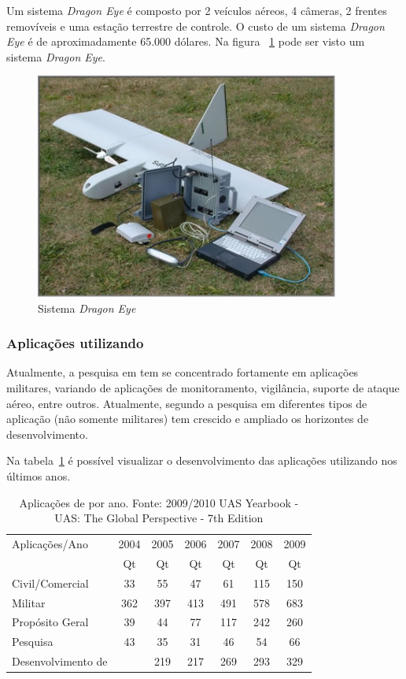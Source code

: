 Um sistema \emph{Dragon Eye} é composto por 2 veículos aéreos, 4 câmeras, 2 frentes removíveis e uma estação terrestre de controle. O custo de um sistema \emph{Dragon Eye} é
de aproximadamente 65.000 dólares. Na figura ~\ref{fig:dragon_eye} pode ser visto um sistema \emph{Dragon Eye}.


\begin{figure}[h!]
\centering
\includegraphics[width=10cm]{pictures/dragon_eye_system.jpg}
\caption{Sistema \emph{Dragon Eye} }
 \label{fig:dragon_eye}
\end{figure}




\subsubsection{Aplicações utilizando \vants}
Atualmente, a pesquisa em \vants tem se concentrado fortamente em aplicações militares, variando de aplicações de monitoramento, vigilância, suporte de ataque aéreo, entre outros. Atualmente, segundo \cite{Valavanis2007} a pesquisa em diferentes tipos de aplicação (não somente militares) tem crescido e ampliado os horizontes de desenvolvimento.

Na tabela~\ref{tbl:vants_por_ano} é possível visualizar o desenvolvimento das aplicações utilizando \vants nos últimos anos.


\begin{table}[h!]
\centering
	\begin{tabular}{| l | c | c | c | c | c | c |}
		\hline
		Aplicações/Ano & 2004 & 2005 & 2006 & 2007 & 2008 & 2009 \\
		\cline{2-7}
		 & Qt & Qt & Qt & Qt & Qt & Qt  \\
		\hline
		Civil/Comercial  & 33 &  55  & 47  & 61  & 115  & 150 \\
		Militar  & 362  & 397  & 413  & 491  & 578  & 683 \\
		Propósito Geral &  39  & 44  & 77  & 117  & 242  & 260 \\
		Pesquisa  & 43  & 35  & 31  & 46  & 54  & 66 \\
		Desenvolvimento de \vants &   & 219  & 217  & 269  & 293  & 329 \\
		\hline
	\end{tabular}

	\caption{Aplicações de \vants por ano. Fonte: 2009/2010 UAS Yearbook - UAS: The Global Perspective - 7th Edition}
	\label{tbl:vants_por_ano}
\end{table}

